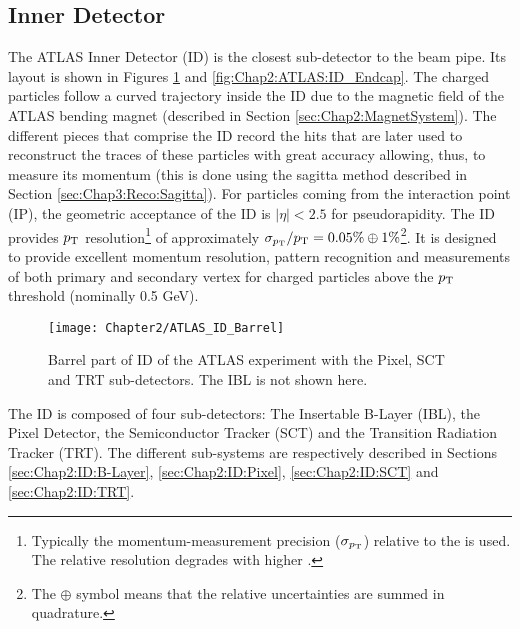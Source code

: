 \subsection{Inner Detector}
\label{sec:Chap2:ID}
The ATLAS Inner Detector (ID)  \cite{CERN-LHCC-97-016}\cite{ATLAS:2010ylv}\cite{ATLAS:2008xda} is the closest sub-detector to the beam pipe.
Its layout is shown in Figures \ref{fig:Chap2:ATLAS:ID_Barel} and \ref{fig:Chap2:ATLAS:ID_Endcap}. 
The charged particles follow a curved trajectory inside the ID due to the magnetic field of the ATLAS 
bending magnet (described in Section \ref{sec:Chap2:MagnetSystem}). The different pieces that
comprise the ID record the hits that are later used  to reconstruct the traces of these particles 
with great accuracy allowing, thus, to measure its momentum 
(this is done using the sagitta method described in Section \ref{sec:Chap3:Reco:Sagitta}).
For particles coming from the interaction point (IP), the geometric acceptance of the ID is 
$|\eta| < 2.5$ for pseudorapidity. %
The ID provides $p_{\text{T}}$ resolution\footnote{Typically the momentum-measurement precision ($\sigma_{p_{\text{T}}}$) 
relative to the \pT is used.  The relative resolution degrades with higher \pT.}  
of approximately $\sigma_{p_{\text{T}}} / p_{\text{T}} = 0.05\% \oplus 1\%$\footnote{The $\oplus$ symbol means that the 
relative uncertainties are summed in quadrature.}.
It is designed to provide excellent momentum resolution, pattern recognition and measurements of both primary and secondary vertex
for charged particles above the $p_{\text{T}}$ threshold (nominally 0.5 GeV).

\begin{figure}
	\centering
 	 \texttt{[image: Chapter2/ATLAS\_ID\_Barrel]}
	 \caption{Barrel part of ID of the ATLAS experiment with the Pixel, SCT and TRT sub-detectors. The IBL is not shown here.}
	\label{fig:Chap2:ATLAS:ID_Barel}
\end{figure}

The ID is composed of four sub-detectors: The Insertable B-Layer (IBL), the Pixel Detector, 
the Semiconductor Tracker (SCT) and the Transition Radiation Tracker (TRT). 
The different sub-systems are respectively described in Sections \ref{sec:Chap2:ID:B-Layer},
 \ref{sec:Chap2:ID:Pixel}, \ref{sec:Chap2:ID:SCT} and \ref{sec:Chap2:ID:TRT}.


